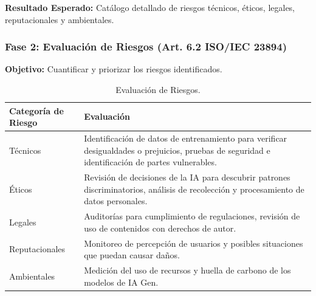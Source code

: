 \documentclass[12pt]{article}
\begin{document}
\textbf{Resultado Esperado:} Catálogo detallado de riesgos técnicos, éticos, legales, reputacionales y ambientales.

\subsubsection{Fase 2: Evaluación de Riesgos (Art. 6.2 ISO/IEC 23894)}
\textbf{Objetivo:} Cuantificar y priorizar los riesgos identificados.

\begin{table}[h]
    \centering
    \begin{tabular}{p{3cm}p{11cm}}
        \toprule
        \textbf{Categoría de Riesgo} & \textbf{Evaluación} \\
        \midrule
        Técnicos & Identificación de datos de entrenamiento para verificar desigualdades o prejuicios, pruebas de seguridad e identificación de partes vulnerables. \\
        Éticos & Revisión de decisiones de la IA para descubrir patrones discriminatorios, análisis de recolección y procesamiento de datos personales. \\
        Legales & Auditorías para cumplimiento de regulaciones, revisión de uso de contenidos con derechos de autor. \\
        Reputacionales & Monitoreo de percepción de usuarios y posibles situaciones que puedan causar daños. \\
        Ambientales & Medición del uso de recursos y huella de carbono de los modelos de IA Gen. \\
        \bottomrule
    \end{tabular}
    \caption{Evaluación de Riesgos.}
    \label{tab:evaluacion_riesgos}
\end{table}
\end{document}
